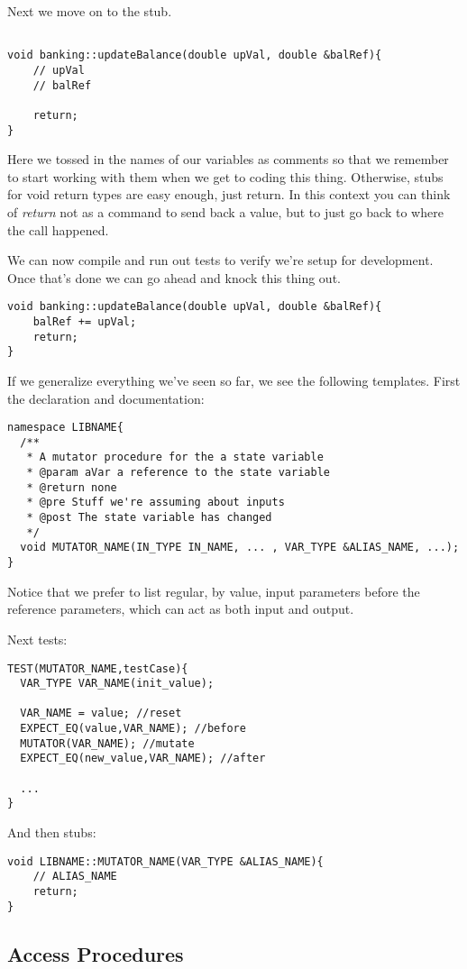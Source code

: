 Next we move on to the stub.
\begin{verbatim}

void banking::updateBalance(double upVal, double &balRef){
    // upVal
	// balRef

	return;
}

\end{verbatim}
Here we tossed in the names of our variables as comments so that we remember to start working with them when we get to coding this thing. Otherwise, stubs for void return types are easy enough, just return.  In this context you can think of \textit{return} not as a command to send back a value, but to just go back to where the call happened.  

We can now compile and run out tests to verify we're setup for development. Once that's done we can go ahead and knock this thing out.
\begin{verbatim}
void banking::updateBalance(double upVal, double &balRef){
	balRef += upVal;
	return;
}
\end{verbatim}

If we generalize everything we've seen so far, we see the following templates. First the declaration and documentation:
\begin{verbatim}
namespace LIBNAME{
  /**
   * A mutator procedure for the a state variable
   * @param aVar a reference to the state variable
   * @return none
   * @pre Stuff we're assuming about inputs
   * @post The state variable has changed
   */
  void MUTATOR_NAME(IN_TYPE IN_NAME, ... , VAR_TYPE &ALIAS_NAME, ...);
}
\end{verbatim}
Notice that we prefer to list regular, by value, input parameters before the reference parameters, which can act as both input and output.

Next tests: 
\begin{verbatim}
TEST(MUTATOR_NAME,testCase){
  VAR_TYPE VAR_NAME(init_value);

  VAR_NAME = value; //reset
  EXPECT_EQ(value,VAR_NAME); //before
  MUTATOR(VAR_NAME); //mutate
  EXPECT_EQ(new_value,VAR_NAME); //after

  ...
}
\end{verbatim}


And then stubs:
\begin{verbatim}
void LIBNAME::MUTATOR_NAME(VAR_TYPE &ALIAS_NAME){
	// ALIAS_NAME	
	return;
}
\end{verbatim} 

\subsection{Access Procedures}

